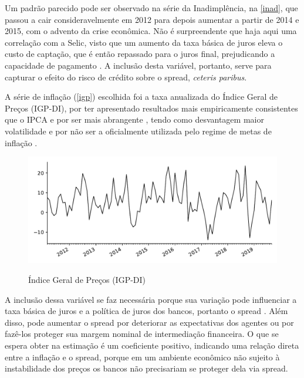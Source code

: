 \documentclass[a4paper,
               article,
               12pt,
               openany,
               oneside,
               english,
               brazil]{abntex2}
\numberwithin{equation}{section}
\begin{document}
    Um padrão parecido pode ser observado na série da Inadimplência, na \autoref{inad}, que passou a cair consideravelmente em 2012 para depois aumentar a partir de 2014 e 2015, com o advento da crise econômica. Não é surpreendente que haja aqui uma correlação com a Selic, visto que um aumento da taxa básica de juros eleva o custo de captação, que é então repassado para o juros final, prejudicando a capacidade de pagamento \cite[p.~390]{oliveira2007}. A inclusão desta variável, portanto, serve para capturar o efeito do risco de crédito sobre o spread, \textit{ceteris paribus}.

    A série de inflação (\autoref{igp}) escolhida foi a taxa anualizada do Índice Geral de Preços (IGP-DI), por ter apresentado resultados mais empiricamente consistentes que o IPCA \cite[p.~66]{rocha09} e por ser mais abrangente \cite[p.~21]{afanasieff02}, tendo como desvantagem maior volatilidade e por não ser a oficialmente utilizada pelo regime de metas de inflação \cite[23]{chaim}.

\begin{figure}[h]
  \centering
    \caption{Índice Geral de Preços (IGP-DI)}
      \includegraphics[width = \textwidth, scale=0.75]{igp.pdf}
      \label{igp}
\end{figure}
    
    A inclusão dessa variável se faz necessária porque sua variação pode influenciar a taxa básica de juros e a política de juros dos bancos, portanto o spread \cite[p.~14]{bignotto06}. Além disso, pode aumentar o spread por deteriorar as expectativas dos agentes ou por fazê-los proteger sua margem nominal de intermediação financeira. O que se espera obter na estimação é um coeficiente positivo, indicando uma relação direta entre a inflação e o spread, porque em um ambiente econômico não sujeito à instabilidade dos preços os bancos não precisariam se proteger dela via spread. 
    
\end{document}
